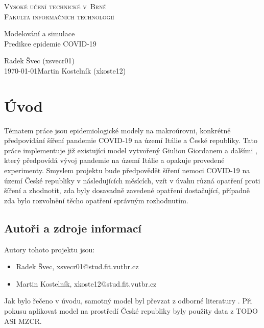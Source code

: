 \documentclass[a4paper,11pt]{article}
\begin{document}
	\begin{titlepage}
		\begin{center}
			\textsc{\Huge Vysoké učení technické v~Brně\\
				\vspace{0.4em}\huge Fakulta informačních technologií}
			
			
			{\LARGE Modelování a simulace\\
				\Huge Predikce epidemie COVID-19\\ \vspace{0.3em}}
			
			
			{\Large \hfill Radek Švec (xsvecr01)\\ \today \hfill Martin Kostelník (xkoste12)}
		\end{center}
	\end{titlepage}

	\section{Úvod}
		Tématem práce jsou epidemiologické modely na makroúrovni, konkrétně předpovídání šíření pandemie COVID-19 na území Itálie a České republiky. Tato práce implementuje již existující model vytvořený Giuliou Giordanem a dalšími \cite{source}, který předpovídá vývoj pandemie na území Itálie a opakuje provedené experimenty. Smyslem projektu bude předpovědět šíření nemoci COVID-19 na území České republiky v následujících měsících, vzít v úvahu různá opatření proti šíření a zhodnotit, zda byly dosavadně zavedené opatření dostačující, případně zda bylo rozvolnění těcho opatření správným rozhodnutím.
		
	\subsection{Autoři a zdroje informací}
		Autory tohoto projektu jsou:
		\begin{itemize}
			\item Radek Švec, xsvecr01@stud.fit.vutbr.cz
			\item Martin Kostelník, xkoste12@stud.fit.vutbr.cz
		\end{itemize}
	
	Jak bylo řečeno v úvodu, samotný model byl převzat z odborné literatury \cite{source}. Při pokusu aplikovat model na prostředí České republiky byly použity data z TODO ASI MZCR.
			
\end{document}
